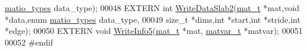 \begin{DoxyCode}
      \hyperlink{group___m_a_t_gacf7b3b879282b7ab3a51190e49bf3453}{matio\_types} data\_type);
00048 EXTERN \textcolor{keywordtype}{int}       \hyperlink{mat5_8c_a04eba34668a0de871c4f245702f802f7}{WriteDataSlab2}(\hyperlink{struct__mat__t}{mat\_t} *mat,\textcolor{keywordtype}{void} *data,\textcolor{keyword}{enum} 
      \hyperlink{group___m_a_t_gacf7b3b879282b7ab3a51190e49bf3453}{matio\_types} data\_type,
00049                      \textcolor{keywordtype}{size\_t} *dims,\textcolor{keywordtype}{int} *start,\textcolor{keywordtype}{int} *stride,\textcolor{keywordtype}{int} *edge);
00050 EXTERN \textcolor{keywordtype}{void}      \hyperlink{mat5_8c_a80e4ba45ec110d05657f8f39ffd9ee27}{WriteInfo5}(\hyperlink{struct__mat__t}{mat\_t} *mat, \hyperlink{group___m_a_t_structmatvar__t}{matvar\_t} *matvar);
00051 
00052 \textcolor{preprocessor}{#endif}
\end{DoxyCode}
